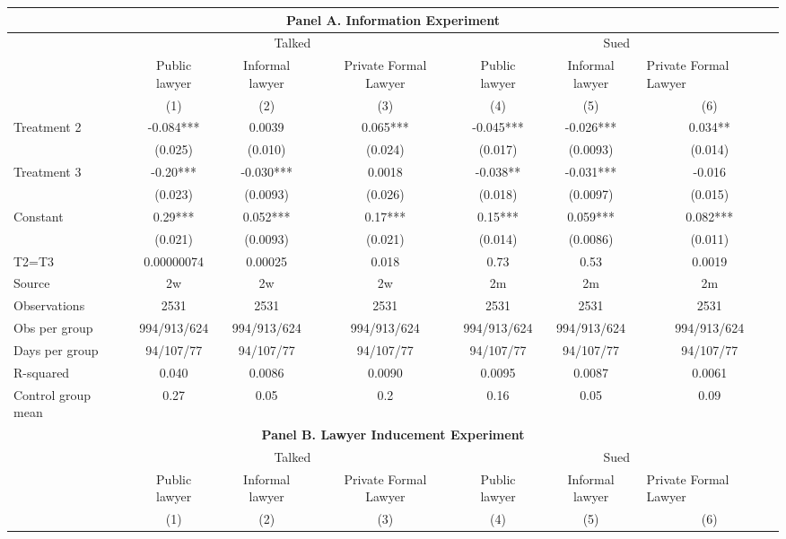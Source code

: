 \begin{tabular}{lcccccc}
\toprule
\multicolumn{7}{c}{\textbf{Panel A. Information Experiment}} \\
\midrule
      & \multicolumn{3}{c}{Talked} & \multicolumn{3}{c}{Sued } \\
\midrule
      & Public lawyer & Informal lawyer & Private Formal Lawyer & Public lawyer & Informal lawyer & \multicolumn{1}{l}{Private Formal Lawyer} \\
\midrule
      & (1)   & (2)   & (3)   & (4)   & (5)   & (6) \\
Treatment 2 & -0.084*** & 0.0039 & 0.065*** & -0.045*** & -0.026*** & 0.034** \\
      & (0.025) & (0.010) & (0.024) & (0.017) & (0.0093) & (0.014) \\
Treatment 3 & -0.20*** & -0.030*** & 0.0018 & -0.038** & -0.031*** & -0.016 \\
      & (0.023) & (0.0093) & (0.026) & (0.018) & (0.0097) & (0.015) \\
Constant & 0.29*** & 0.052*** & 0.17*** & 0.15*** & 0.059*** & 0.082*** \\
      & (0.021) & (0.0093) & (0.021) & (0.014) & (0.0086) & (0.011) \\
T2=T3 & 0.00000074 & 0.00025 & 0.018 & 0.73  & 0.53  & 0.0019 \\
\midrule
Source & 2w    & 2w    & 2w    & 2m    & 2m    & 2m \\
Observations & 2531  & 2531  & 2531  & 2531  & 2531  & 2531 \\
Obs per group & 994/913/624 & 994/913/624 & 994/913/624 & 994/913/624 & 994/913/624 & 994/913/624 \\
Days per group & 94/107/77 & 94/107/77 & 94/107/77 & 94/107/77 & 94/107/77 & 94/107/77 \\
R-squared & 0.040 & 0.0086 & 0.0090 & 0.0095 & 0.0087 & 0.0061 \\
Control group mean & 0.27  & 0.05  & 0.2   & 0.16  & 0.05  & 0.09 \\
\midrule
\midrule
\multicolumn{7}{c}{\textbf{Panel B. Lawyer Inducement Experiment}} \\
\midrule
      & \multicolumn{3}{c}{Talked} & \multicolumn{3}{c}{Sued } \\
\midrule
      & Public lawyer & Informal lawyer & Private Formal Lawyer & Public lawyer & Informal lawyer & \multicolumn{1}{l}{Private Formal Lawyer} \\
\midrule
      & (1)   & (2)   & (3)   & (4)   & (5)   & (6) \\

\end{tabular}

